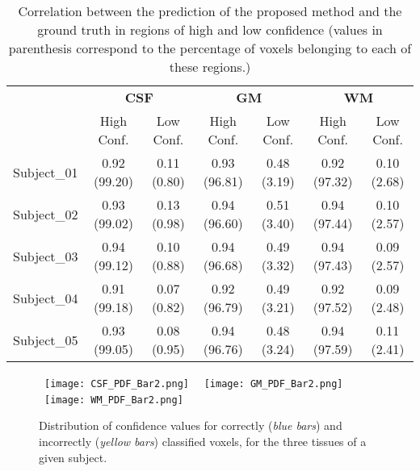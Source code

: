 \documentclass[twoside,espcrc2]{elsarticle}
\begin{document}
\begin{table}[ht!]
\footnotesize
\centering
\caption{Correlation between the prediction of the proposed method and the ground truth in regions of high and low confidence (values in parenthesis correspond to the percentage of voxels belonging to each of these regions.)}
\label{tab:correlation}
\begin{tabular}{lcccccc}
\toprule
 & \multicolumn{2}{c}{\textbf{CSF}} & \multicolumn{2}{c}{\textbf{GM}} & \multicolumn{2}{c}{\textbf{WM}} \\ 
\cmidrule(lr){2-3}\cmidrule(lr){4-5}\cmidrule(lr){6-7}
& High Conf. & Low Conf. & High Conf. & Low Conf. & High Conf. & Low Conf.  \\ 
\midrule\midrule
Subject\_01 &  0.92 (99.20) & 0.11 (0.80)   & 0.93 (96.81) &  0.48 (3.19) & 0.92 (97.32) &  0.10 (2.68)  \\
Subject\_02 &  0.93 (99.02) &  0.13 (0.98)  & 0.94 (96.60) & 0.51 (3.40) & 0.94 (97.44) &  0.10 (2.57) \\
Subject\_03 &  0.94 (99.12) & 0.10 (0.88)  & 0.94 (96.68)  & 0.49 (3.32)  & 0.94 (97.43) & 0.09 (2.57)   \\
Subject\_04 & 0.91 (99.18) & 0.07 (0.82)  & 0.92 (96.79)   &  0.49 (3.21)&  0.92 (97.52) & 0.09 (2.48)    \\
Subject\_05 & 0.93 (99.05)   &  0.08 (0.95)  & 0.94 (96.76)  & 0.48 (3.24) & 0.94 (97.59) &  0.11 (2.41)                \\ 
\bottomrule
\end{tabular}
\end{table}


\begin{figure}[ht!]
\begin{center}
     \mbox{
        \texttt{[image: CSF\_PDF\_Bar2.png]}
        }
     \mbox{
        \texttt{[image: GM\_PDF\_Bar2.png]}
        }
   \mbox{
        \texttt{[image: WM\_PDF\_Bar2.png]}
        }     
\caption{Distribution of confidence values for correctly (\textit{blue bars}) and incorrectly (\textit{yellow bars}) classified voxels, for the three tissues of a given subject.}
\label{fig:PDF_Condifence}
\end{center}
\end{figure}
\end{document}
